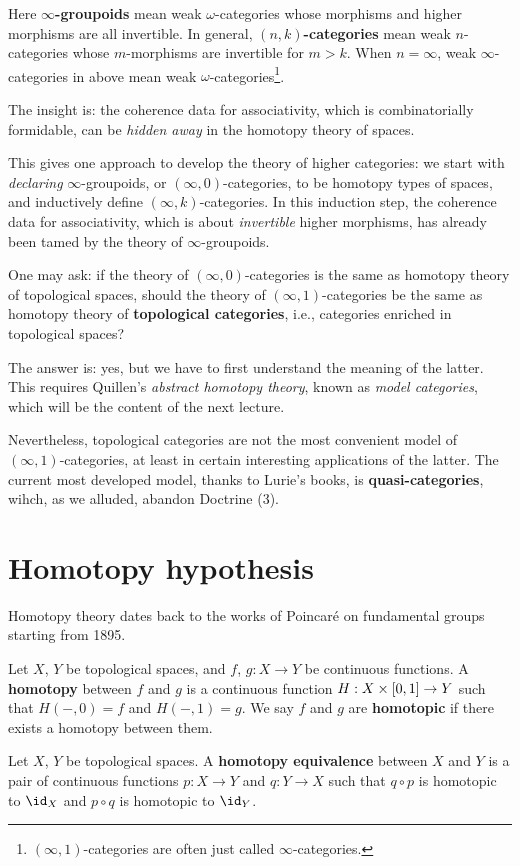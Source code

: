 \ssec{}

Here \textbf{$\infty$-groupoids} mean weak $\omega$-categories whose morphisms and higher morphisms are all invertible. In general, \textbf{$(n,k)$-categories} mean weak $n$-categories whose $m$-morphisms are invertible for $m>k$. When $n=\infty$, weak $\infty$-categories in above mean weak $\omega$-categories\footnote{
	$(\infty,1)$-categories are often just called $\infty$-categories.
}.

\medskip

The insight is: the coherence data for associativity, which is combinatorially formidable, can be \emph{hidden away} in the homotopy theory of spaces.

\medskip
This gives one approach to develop the theory of higher categories: we start with \emph{declaring} $\infty$-groupoids, or $(\infty,0)$-categories, to be homotopy types of spaces, and inductively define $(\infty,k)$-categories. In this induction step, the coherence data for associativity, which is about \emph{invertible} higher morphisms, has already been tamed by the theory of $\infty$-groupoids.

\ssec{}
One may ask: if the theory of $(\infty,0)$-categories is the same as homotopy theory of topological spaces, should the theory of $(\infty,1)$-categories be the same as homotopy theory of \textbf{topological categories}, i.e., categories enriched in topological spaces?

\medskip
The answer is: yes, but we have to first understand the meaning of the latter. This requires Quillen's \emph{abstract homotopy theory}, known as \emph{model categories}, which will be the content of the next lecture.

\medskip
Nevertheless, topological categories are not the most convenient model of $(\infty,1)$-categories, at least in certain interesting applications of the latter. The current most developed model, thanks to Lurie's books, is \textbf{quasi-categories}, wihch, as we alluded, abandon Doctrine (3).


\section{Homotopy hypothesis}

\ssec{}
	
Homotopy theory dates back to the works of Poincaré on fundamental groups starting from 1895.


\begin{defn}
	Let $X$, $Y$ be topological spaces, and $f$, $g:X\to Y$ be continuous functions. A \textbf{homotopy} between $f$ and $g$ is a continuous function $H: X\mt [0,1] \to Y$ such that $H(-,0)=f$ and $H(-,1)=g$. We say $f$ and $g$ are \textbf{homotopic} if there exists a homotopy between them.

	Let $X$, $Y$ be topological spaces. A \textbf{homotopy equivalence} between $X$ and $Y$ is a pair of continuous functions $p:X\to Y$ and $q:Y \to X$ such that $q\circ p$ is homotopic to $\id_X$ and $p\circ q$ is homotopic to $\id_Y$.
\end{defn}

